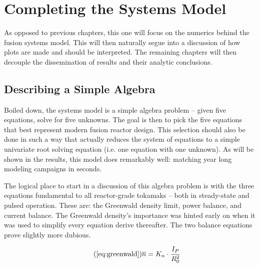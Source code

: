 %
%
%
%
%
%
%
%

\chapter{Completing the Systems Model}

As opposed to previous chapters, this one will focus on the numerics behind the fusion systems model. This will then naturally segue into a discussion of how plots are made and should be interpreted. The remaining chapters will then decouple the dissemination of results and their analytic conclusions.

\section{Describing a Simple Algebra}

Boiled down, the systems model is a simple algebra problem -- given five equations, solve for five unknowns. The goal is then to pick the five equations that best represent modern fusion reactor design. This selection should also be done in such a way that actually reduces the system of equations to a simple univariate root solving equation (i.e. one equation with one unknown). As will be shown in the results, this model does remarkably well: matching year long modeling campaigns in seconds.

The logical place to start in a discussion of this algebra problem is with the three equations fundamental to all reactor-grade tokamaks -- both in steady-state and pulsed operation. These are: the Greenwald density limit, power balance, and current balance. The Greenwald density's importance was hinted early on when it was used to simplify every equation derive thereafter. The two balance equations prove slightly more dubious.

\begin{equation}
	\tag{\ref{eq:greenwald}}
	\overline n = K_n \cdot \frac{I_P}{R_0^2}
\end{equation}

